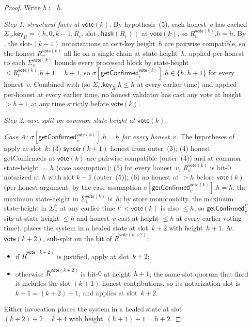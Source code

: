 \documentclass{article}
\newcommand{\slot}[0]{\ensuremath{\operatorname{\mathrm{slot}}}}
\newcommand{\hash}{\mathsf{hash}}
\newcommand{\key}{\mathsf{key}}
\newcommand{\syncer}{\mathsf{syncer}}
\newcommand{\vote}{\mathsf{vote}}
\newcommand{\comm}[1]{\bar{#1}}
\newcommand{\getConfirmed}{\textsf{getConfirmed}\xspace}
\theoremstyle{plain}
\theoremstyle{definition}
\theoremstyle{remark}
\begin{document}
\begin{proof}
Write $h \coloneqq \comm{h}$.

\emph{Step 1: structural facts at $\vote(k)$.}
By hypothesis~(5), each honest~$v$ has cached $\Sigma_v.\key_R = (h, 0, k-1, R_v.\slot, \hash(R_v))$ at $\vote(k)$, so $R_v^{\vote(k)}.h = h$. By , the slot-$(k-1)$ notarizations at cert-key height~$h$ are pairwise compatible, so the honest $R_v^{\vote(k)}$ all lie on a single chain at state-height~$h$.  applied per-honest to each $\Sigma_v^{\vote(k)}$ bounds every processed block by state-height $\leq R_v^{\vote(k)}.h + 1 = h + 1$, so $\sigma[\getConfirmed_v^{\vote(k)}].h \in \{h, h+1\}$ for every honest~$v$. Combined with  (so $\Sigma_v.\key_R.h \leq h$ at every earlier time) and  applied per-honest at every earlier time, no honest validator has cast any vote at height $> h+1$ at any time strictly before $\vote(k)$.

\emph{Step 2: case split on common state-height at $\vote(k)$.}

\emph{Case A: $\sigma[\getConfirmed_v^{\vote(k)}].h = h$ for every honest~$v$.}
The hypotheses of  apply at slot~$k$: (3) $\syncer(k+1)$ honest from outer~(3); (4) honest \getConfirmed{}s at $\vote(k)$ are pairwise compatible (outer~(4)) and at common state-height $= h$ (case assumption); (5) for every honest~$v$, $R_v^{\vote(k)}$ is bit-$0$ notarized at $h$ with slot $k-1$ (outer~(5)); (6) no honest at $> h$ before $\vote(k)$ (per-honest argument: by the case assumption $\sigma[\getConfirmed_v^{\vote(k)}].h = h$, the maximum state-height in $\Sigma_v^{\vote(k)}$ is~$h$; by store monotonicity, the maximum state-height in $\Sigma_v^{t'}$ at any earlier time $t' < \vote(k)$ is also $\leq h$, so $\getConfirmed_v^{t'}$ sits at state-height $\leq h$ and honest~$v$ cast at height $\leq h$ at every earlier voting time).  places the system in a healed state at slot~$k+2$ with height~$h+1$.
At $\vote(k+2)$, sub-split on the bit of $\comm{R}^{\vote(k+2)}$:
\begin{itemize}
  \item if $\comm{R}^{\vote(k+2)}$ is justified, apply  at slot~$k+2$;
  \item otherwise $\comm{R}^{\vote(k+2)}$ is bit-$0$ at height~$h+1$; the same-slot quorum that fired it includes the slot-$(k+1)$ honest contributions, so its notarization slot is $k+1 = (k+2)-1$, and  applies at slot~$k+2$.
\end{itemize}
Either invocation places the system in a healed state at slot~$(k+2)+2 = k+4$ with height~$(h+1)+1 = h+2$.


\end{proof}
\end{document}
